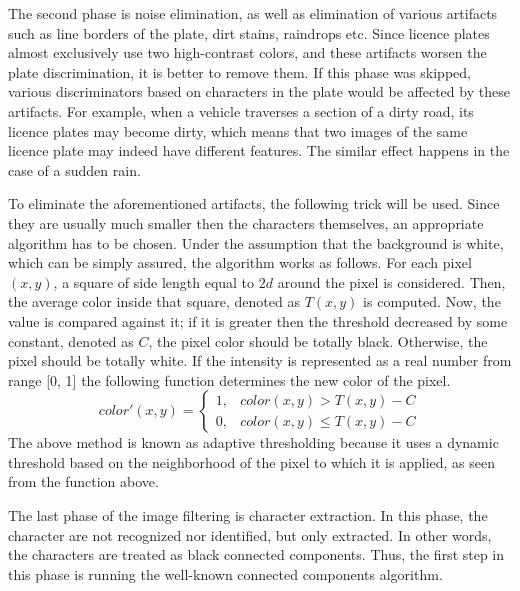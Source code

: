 \documentclass[times, utf8, zavrsni]{fer}
\begin{document}
The second phase is noise elimination, as well as elimination of various
artifacts such as line borders of the plate, dirt stains, raindrops etc. Since
licence plates almost exclusively use two high-contrast colors, and these
artifacts worsen the plate discrimination, it is better to remove them. If this
phase was skipped, various discriminators based on characters in the plate would
be affected by these artifacts. For example, when a vehicle traverses a section
of a dirty road, its licence plates may become dirty, which means that two
images of the same licence plate may indeed have different features. The similar
effect happens in the case of a sudden rain.

To eliminate the aforementioned artifacts, the following trick will be used.
Since they are usually much smaller then the characters themselves, an
appropriate algorithm has to be chosen. Under the assumption that the background
is white, which can be simply assured, the algorithm works as follows. For each
pixel $(x, y)$, a square of side length equal to $2 d$ around the pixel is considered. Then, the average color inside
that square, denoted as $T(x, y)$ is computed. Now, the value is compared
against it; if it is greater then the threshold decreased by some constant,
denoted as $C$, the pixel color should be totally black. Otherwise, the pixel
should be totally white. If the intensity is represented as a real number from
range [0, 1] the following function determines the new color of the pixel.
\begin{displaymath}
   color'(x, y) = \left\{
     \begin{array}{lr}
       1, & color(x, y) > T(x, y) - C \\
       0, & color(x, y) \leq T(x, y) - C
     \end{array}
   \right.
\end{displaymath}
The above method is known as adaptive thresholding because it uses a dynamic
threshold based on the neighborhood of the pixel to which it is applied, as
seen from the function above.


The last phase of the image filtering is character extraction. In this phase,
the character are not recognized nor identified, but only extracted. In other
words, the characters are treated as black connected components. Thus, the first
step in this phase is running the well-known connected components algorithm. 
\end{document}
